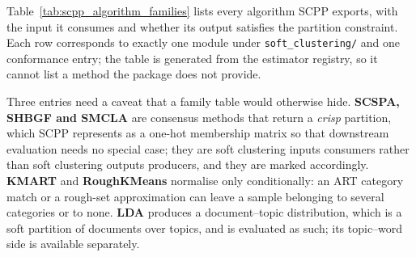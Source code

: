 \documentclass[twoside,11pt]{article}
\begin{document}
Table~\ref{tab:scpp_algorithm_families} lists every algorithm SCPP exports,
with the input it consumes and whether its output satisfies the partition
constraint. Each row corresponds to exactly one module under
\texttt{soft\_clustering/} and one conformance entry; the table is generated
from the estimator registry, so it cannot list a method the package does not
provide.

Three entries need a caveat that a family table would otherwise hide.
\textbf{SCSPA, SHBGF and SMCLA} are consensus methods that return a
\emph{crisp} partition, which SCPP represents as a one-hot membership matrix
so that downstream evaluation needs no special case; they are soft clustering
inputs consumers rather than soft clustering outputs producers, and they are
marked accordingly. \textbf{KMART} and \textbf{RoughKMeans} normalise only
conditionally: an ART category match or a rough-set approximation can leave a
sample belonging to several categories or to none. \textbf{LDA} produces a
document--topic distribution, which is a soft partition of documents over
topics, and is evaluated as such; its topic--word side is available
separately.
\end{document}
